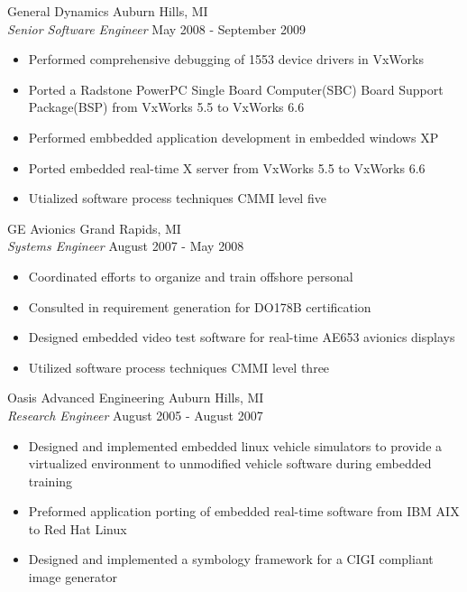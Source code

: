 \documentclass[line]{res}
\begin{document}
\begin{resume}
    \vspace{-2mm}
    General Dynamics \hfill Auburn Hills, MI\\
    {\sl Senior Software Engineer} \hfill May 2008 - September 2009
    \vspace{1mm}
    \begin{itemize} 
    \item Performed comprehensive debugging of 1553 device drivers in VxWorks
    \item Ported a Radstone PowerPC Single Board Computer(SBC) Board
      Support Package(BSP) from VxWorks 5.5 to VxWorks 6.6
    \item Performed embbedded application development in embedded windows XP
    \item Ported embedded real-time X server from VxWorks 5.5 to VxWorks 6.6
    \item Utialized software process techniques CMMI level five
    \end{itemize}

    \vspace{-2mm}
    GE Avionics \hfill Grand Rapids, MI\\
    {\sl Systems Engineer} \hfill August 2007 - May 2008
    \vspace{1mm}
    \begin{itemize} 
      \item Coordinated efforts to organize and train offshore personal
      \item Consulted in requirement generation for DO178B certification
      \item Designed embedded video test software for real-time AE653 avionics displays  
      \item Utilized software process techniques CMMI level three
    \end{itemize}

    \vspace{-2mm}
    Oasis Advanced Engineering \hfill Auburn Hills, MI\\
    {\sl Research Engineer} \hfill August 2005 - August 2007
    \vspace{1mm}
    \begin{itemize} 
    \item Designed and implemented embedded linux vehicle simulators to 
      provide a virtualized environment to unmodified vehicle software 
      during embedded training  
    \item Preformed application porting of embedded real-time software from IBM
      AIX to Red Hat Linux
    \item Designed and implemented a symbology framework for a CIGI compliant 
      image generator
    \end{itemize}


\end{resume}
\end{document}
